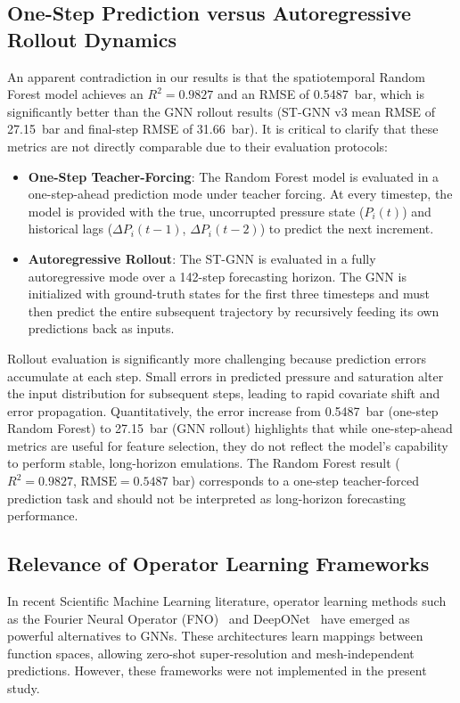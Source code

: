 \subsection{One-Step Prediction versus Autoregressive Rollout Dynamics}
An apparent contradiction in our results is that the spatiotemporal Random Forest model achieves an $R^2 = 0.9827$ and an RMSE of 0.5487~bar, which is significantly better than the GNN rollout results (ST-GNN v3 mean RMSE of 27.15~bar and final-step RMSE of 31.66~bar). It is critical to clarify that these metrics are not directly comparable due to their evaluation protocols:
\begin{itemize}
    \item \textbf{One-Step Teacher-Forcing}: The Random Forest model is evaluated in a one-step-ahead prediction mode under teacher forcing. At every timestep, the model is provided with the true, uncorrupted pressure state ($P_i(t)$) and historical lags ($\Delta P_i(t-1)$, $\Delta P_i(t-2)$) to predict the next increment.
    \item \textbf{Autoregressive Rollout}: The ST-GNN is evaluated in a fully autoregressive mode over a 142-step forecasting horizon. The GNN is initialized with ground-truth states for the first three timesteps and must then predict the entire subsequent trajectory by recursively feeding its own predictions back as inputs.
\end{itemize}

Rollout evaluation is significantly more challenging because prediction errors accumulate at each step. Small errors in predicted pressure and saturation alter the input distribution for subsequent steps, leading to rapid covariate shift and error propagation. Quantitatively, the error increase from 0.5487~bar (one-step Random Forest) to 27.15~bar (GNN rollout) highlights that while one-step-ahead metrics are useful for feature selection, they do not reflect the model's capability to perform stable, long-horizon emulations. The Random Forest result ($R^2 = 0.9827$, $\text{RMSE} = 0.5487$ bar) corresponds to a one-step teacher-forced prediction task and should not be interpreted as long-horizon forecasting performance.

\subsection{Relevance of Operator Learning Frameworks}
In recent Scientific Machine Learning literature, operator learning methods such as the Fourier Neural Operator (FNO)~\cite{li2020fno} and DeepONet~\cite{lu2021deeponet} have emerged as powerful alternatives to GNNs. These architectures learn mappings between function spaces, allowing zero-shot super-resolution and mesh-independent predictions. However, these frameworks were not implemented in the present study.

